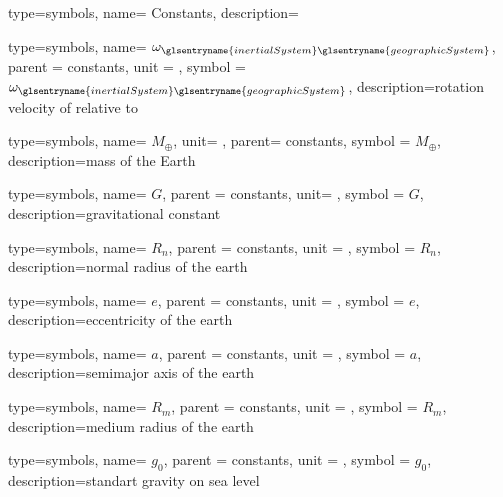 {type=symbols,
    name= {Constants},
    description={}
}

{type=symbols,
    name= \ensuremath{\omega_{\glsentryname{inertialSystem}\glsentryname{geographicSystem}}},
    parent = {constants},
    unit = \unexpanded{\si{\radian\per\second}},
    symbol = \ensuremath{\omega_{\glsentryname{inertialSystem}\glsentryname{geographicSystem}}},
    description={rotation velocity of  relative to 
        }
}

{type=symbols,
    name= \ensuremath{M_\oplus},
    unit= ,
    parent= {constants},
    symbol = \ensuremath{M_\oplus},
    description={mass of the Earth}
}

{type=symbols,
    name= \ensuremath{G},
    parent = {constants},
    unit= \unexpanded{\si{\meter\cubic\per\kilogram\per\second\squared}},
    symbol = \ensuremath{G},
    description={gravitational constant}
}


{type=symbols,
    name= \ensuremath{R_{n}},
    parent = {constants},
    unit = \unexpanded{\si{\meter}},
    symbol = \ensuremath{R_{n}},
    description={normal radius of the earth}
}



{type=symbols,
    name= \ensuremath{e},
    parent = {constants},
    unit = \unexpanded{},
    symbol = \ensuremath{e},
    description={eccentricity of the earth}
}

{type=symbols,
    name= \ensuremath{a},
    parent = {constants},
    unit = \unexpanded{\si{\meter}},
    symbol = \ensuremath{a},
    description={semimajor axis of the earth}
}

{type=symbols,
    name= \ensuremath{R_m},
    parent = {constants},
    unit = \unexpanded{\si{\meter}},
    symbol = \ensuremath{R_m},
    description={medium radius of the earth}
}

{type=symbols,
  name= \ensuremath{g_0},
  parent = {constants},
  unit = \unexpanded{\si{\meter\per\second\squared}},
  symbol = \ensuremath{g_0},
  description={standart gravity on sea level}
}
